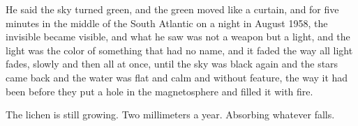 \documentclass[12pt, letterpaper]{article}
\begin{document}
He said the sky turned green, and the green moved like a curtain, and for five minutes in the middle of the South Atlantic on a night in August 1958, the invisible became visible, and what he saw was not a weapon but a light, and the light was the color of something that had no name, and it faded the way all light fades, slowly and then all at once, until the sky was black again and the stars came back and the water was flat and calm and without feature, the way it had been before they put a hole in the magnetosphere and filled it with fire.

The lichen is still growing. Two millimeters a year. Absorbing whatever falls.
\end{document}
